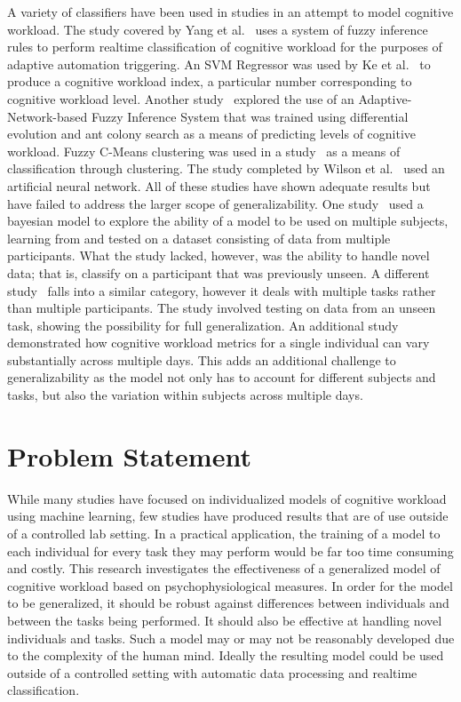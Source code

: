 \documentclass[11pt]{article}
\begin{document}
A variety of classifiers have been used in studies in an attempt to model cognitive workload. The study covered by Yang et al.~\cite{Yang} uses a system of fuzzy inference rules to perform realtime classification of cognitive workload for the purposes of adaptive automation triggering. An SVM Regressor was used by Ke et al.~\cite{Ke} to produce a cognitive workload index, a particular number corresponding to cognitive workload level. Another study~\cite{Wang_R} explored the use of an Adaptive-Network-based Fuzzy Inference System that was trained using differential evolution and ant colony search as a means of predicting levels of cognitive workload. Fuzzy C-Means clustering was used in a study~\cite{Zhang} as a means of classification through clustering. The study completed by Wilson et al.~\cite{Wilson} used an artificial neural network. All of these studies have shown adequate results but have failed to address the larger scope of generalizability. One study~\cite{Wang_Z} used a bayesian model to explore the ability of a model to be used on multiple subjects, learning from and tested on a dataset consisting of data from multiple participants. What the study lacked, however, was the ability to handle novel data; that is, classify on a participant that was previously unseen. A different study~\cite{Ke} falls into a similar category, however it deals with multiple tasks rather than multiple participants. The study involved testing on data from an unseen task,  showing the possibility for full generalization. An additional study~\cite{Christensen} demonstrated how cognitive workload metrics for a single individual can vary substantially across multiple days. This adds an additional challenge to generalizability as the model not only has to account for different subjects and tasks, but also the variation within subjects across multiple days.


\section{Problem Statement}
While many studies have focused on individualized models of cognitive workload using machine learning, few studies have produced results that are of use outside of a controlled lab setting. In a practical application, the training of a model to each individual for every task they may perform would be far too time consuming and costly. This research investigates the effectiveness of a generalized model of cognitive workload based on psychophysiological measures. In order for the model to be generalized, it should be robust against differences between individuals and between the tasks being performed. It should also be effective at handling novel individuals and tasks. Such a model may or may not be reasonably developed due to the complexity of the human mind. Ideally the resulting model could be used outside of a controlled setting with automatic data processing and realtime classification.
\end{document}
